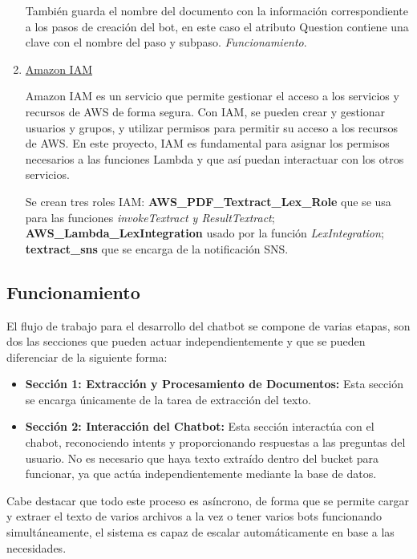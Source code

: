 \begin{enumerate}
    También guarda el nombre del documento con la información correspondiente a los pasos de creación del bot, en este caso el atributo Question contiene una clave con el nombre del paso y subpaso. \textit{Funcionamiento}.

    \item \underline{Amazon IAM}

    Amazon IAM es un servicio que permite gestionar el acceso a los servicios y recursos de AWS de forma segura. Con IAM, se pueden crear y gestionar usuarios y grupos, y utilizar permisos para permitir su acceso a los recursos de AWS. En este proyecto, IAM es fundamental para asignar los permisos necesarios a las funciones Lambda y que así puedan interactuar con los otros servicios. 

    Se crean tres roles IAM: \textbf{AWS\_PDF\_Textract\_Lex\_Role} que se usa para las funciones \textit{invokeTextract y ResultTextract}; \textbf{AWS\_Lambda\_LexIntegration} usado por la función \textit{LexIntegration}; \textbf{textract\_sns} que se encarga de la notificación SNS.
    
    
\end{enumerate}

\subsection{Funcionamiento}\label{funcionamiento-aws}
El flujo de trabajo para el desarrollo del chatbot se compone de varias etapas, son dos las secciones que pueden actuar independientemente y que se pueden diferenciar de la siguiente forma:  

\begin{itemize}
    \item \textbf{Sección 1: Extracción y Procesamiento de Documentos:}
    Esta sección se encarga únicamente de la tarea de extracción del texto.
    \item \textbf{Sección 2: Interacción del Chatbot:} Esta sección interactúa con el chabot, reconociendo intents y proporcionando respuestas a las preguntas del usuario. No es necesario que haya texto extraído dentro del bucket para funcionar, ya que actúa independientemente mediante la base de datos. 
\end{itemize}

Cabe destacar que todo este proceso es asíncrono, de forma que se permite cargar y extraer el texto de varios archivos a la vez o tener varios bots funcionando simultáneamente, el sistema es capaz de escalar automáticamente en base a las necesidades. 

